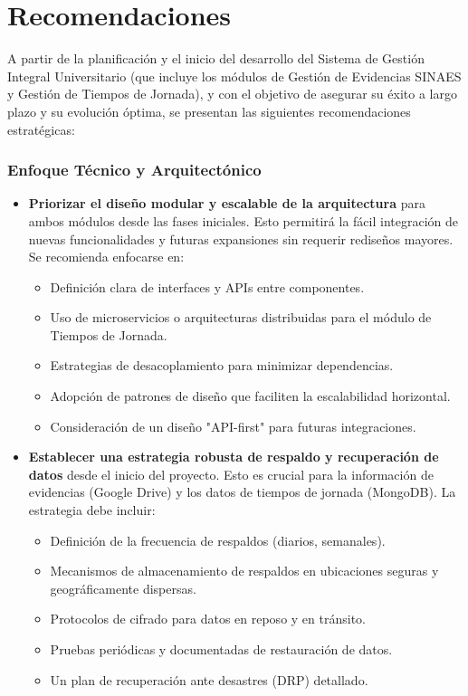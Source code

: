 \chapter{Recomendaciones}

A partir de la planificación y el inicio del desarrollo del Sistema de Gestión Integral
Universitario (que incluye los módulos de Gestión de Evidencias SINAES y Gestión de
Tiempos de Jornada), y con el objetivo de asegurar su éxito a largo plazo y su evolución
óptima, se presentan las siguientes recomendaciones estratégicas:

\subsection{Enfoque Técnico y Arquitectónico}
\begin{itemize}
    \item \textbf{Priorizar el diseño modular y escalable de la arquitectura} para
        ambos módulos desde las fases iniciales. Esto permitirá la fácil integración
        de nuevas funcionalidades y futuras expansiones sin requerir rediseños
        mayores. Se recomienda enfocarse en:
        \begin{itemize}
            \item Definición clara de interfaces y APIs entre componentes.
            \item Uso de microservicios o arquitecturas distribuidas para el módulo de Tiempos de Jornada.
            \item Estrategias de desacoplamiento para minimizar dependencias.
            \item Adopción de patrones de diseño que faciliten la escalabilidad horizontal.
            \item Consideración de un diseño "API-first" para futuras integraciones.
        \end{itemize}

    \item \textbf{Establecer una estrategia robusta de respaldo y recuperación de datos}
        desde el inicio del proyecto. Esto es crucial para la información de evidencias
        (Google Drive) y los datos de tiempos de jornada (MongoDB). La estrategia debe incluir:
        \begin{itemize}
            \item Definición de la frecuencia de respaldos (diarios, semanales).
            \item Mecanismos de almacenamiento de respaldos en ubicaciones seguras y geográficamente dispersas.
            \item Protocolos de cifrado para datos en reposo y en tránsito.
            \item Pruebas periódicas y documentadas de restauración de datos.
            \item Un plan de recuperación ante desastres (DRP) detallado.
        \end{itemize}


\end{itemize}
